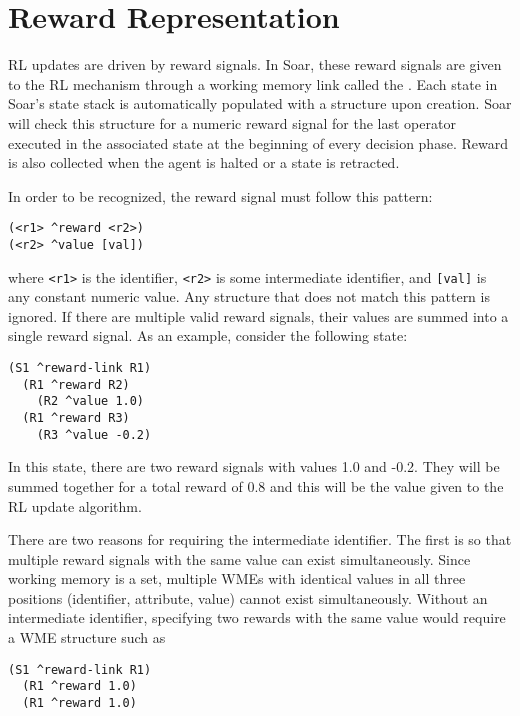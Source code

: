 \section{Reward Representation}
\label{RL-reward}

RL updates are driven by reward signals.
In Soar, these reward signals are given to the RL mechanism through a working memory link called the .
Each state in Soar's state stack is automatically populated with a  structure upon creation.
Soar will check this structure for a numeric reward signal for the last operator executed in the associated state at the beginning of every decision phase.
Reward is also collected when the agent is halted or a state is retracted.

In order to be recognized, the reward signal must follow this pattern:

\begin{verbatim}
(<r1> ^reward <r2>)
(<r2> ^value [val])
\end{verbatim}

where \verb=<r1>= is the  identifier, \verb=<r2>= is some intermediate identifier, and \verb=[val]= is any constant numeric value.
Any structure that does not match this pattern is ignored.
If there are multiple valid reward signals, their values are summed into a single reward signal.
As an example, consider the following state:

\begin{verbatim}
(S1 ^reward-link R1)
  (R1 ^reward R2)
    (R2 ^value 1.0)
  (R1 ^reward R3)
    (R3 ^value -0.2)
\end{verbatim}  

In this state, there are two reward signals with values 1.0 and -0.2.
They will be summed together for a total reward of 0.8 and this will be the value given to the RL update algorithm.

There are two reasons for requiring the intermediate identifier.
The first is so that multiple reward signals with the same value can exist simultaneously.
Since working memory is a set, multiple WMEs with identical values in all three positions (identifier, attribute, value) cannot exist simultaneously.
Without an intermediate identifier, specifying two rewards with the same value would require a WME structure such as

\begin{verbatim}
(S1 ^reward-link R1)
  (R1 ^reward 1.0)
  (R1 ^reward 1.0)
\end{verbatim}

